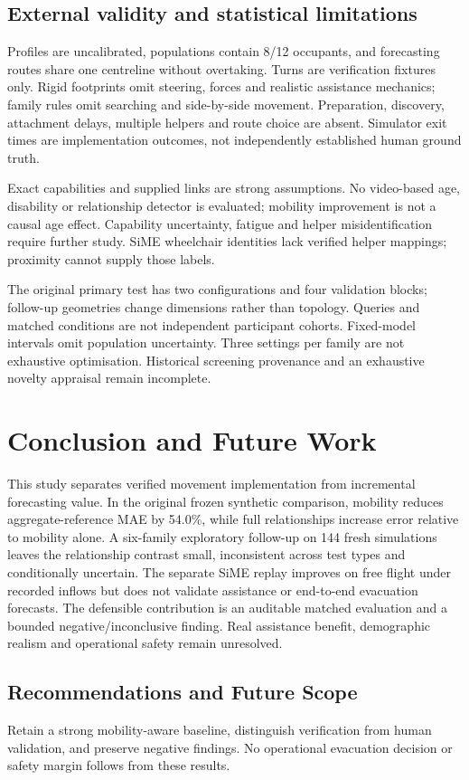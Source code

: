 \documentclass[conference]{IEEEtran}
\begin{document}
\subsection{External validity and statistical limitations}
Profiles are uncalibrated, populations contain 8/12 occupants, and forecasting routes share one centreline without overtaking. Turns are verification fixtures only. Rigid footprints omit steering, forces and realistic assistance mechanics; family rules omit searching and side-by-side movement. Preparation, discovery, attachment delays, multiple helpers and route choice are absent. Simulator exit times are implementation outcomes, not independently established human ground truth.

Exact capabilities and supplied links are strong assumptions. No video-based age, disability or relationship detector is evaluated; mobility improvement is not a causal age effect. Capability uncertainty, fatigue and helper misidentification require further study. SiME wheelchair identities lack verified helper mappings; proximity cannot supply those labels.

The original primary test has two configurations and four validation blocks; follow-up geometries change dimensions rather than topology. Queries and matched conditions are not independent participant cohorts. Fixed-model intervals omit population uncertainty. Three settings per family are not exhaustive optimisation. Historical screening provenance and an exhaustive novelty appraisal remain incomplete.

\section{Conclusion and Future Work}
This study separates verified movement implementation from incremental forecasting value. In the original frozen synthetic comparison, mobility reduces aggregate-reference MAE by 54.0\%, while full relationships increase error relative to mobility alone. A six-family exploratory follow-up on 144 fresh simulations leaves the relationship contrast small, inconsistent across test types and conditionally uncertain. The separate SiME replay improves on free flight under recorded inflows but does not validate assistance or end-to-end evacuation forecasts. The defensible contribution is an auditable matched evaluation and a bounded negative/inconclusive finding. Real assistance benefit, demographic realism and operational safety remain unresolved.

\subsection{Recommendations and Future Scope}
Retain a strong mobility-aware baseline, distinguish verification from human validation, and preserve negative findings. No operational evacuation decision or safety margin follows from these results.
\end{document}
